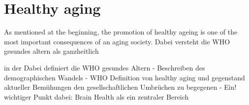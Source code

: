 \section{Healthy aging}
As mentioned at the beginning, the promotion of healthy ageing is one of the most important consequences of an aging society. Dabei versteht die WHO gesundes altern als ganzheitlich 

in der 
Dabei definiert die WHO gesundes Altern 
- Beschreiben des demographischen Wandels 
- WHO Definition von healthy aging und gegenstand aktueller Bemühungen den gesellschaftlichen Umbrüchen zu begegenen 
- Ein! wichtiger Punkt dabei: Brain Health als ein zentraler Bereich 



































